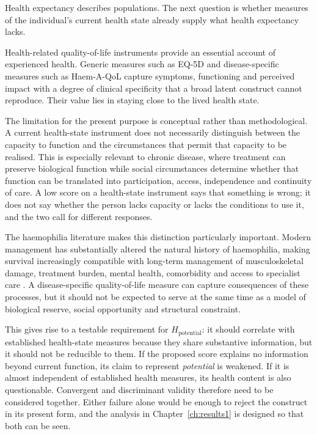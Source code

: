 Health expectancy describes populations. The next question is whether measures of the individual's current health state already supply what health expectancy lacks.

Health-related quality-of-life instruments provide an essential account of experienced health. Generic measures such as EQ-5D \citep{dolan2000,euroqol2020} and disease-specific measures such as Haem-A-QoL capture symptoms, functioning and perceived impact with a degree of clinical specificity that a broad latent construct cannot reproduce. Their value lies in staying close to the lived health state.

The limitation for the present purpose is conceptual rather than methodological. A current health-state instrument does not necessarily distinguish between the capacity to function and the circumstances that permit that capacity to be realised. This is especially relevant to chronic disease, where treatment can preserve biological function while social circumstances determine whether that function can be translated into participation, access, independence and continuity of care. A low score on a health-state instrument says that something is wrong; it does not say whether the person lacks capacity or lacks the conditions to use it, and the two call for different responses.

The haemophilia literature makes this distinction particularly important. Modern management has substantially altered the natural history of haemophilia, making survival increasingly compatible with long-term management of musculoskeletal damage, treatment burden, mental health, comorbidity and access to specialist care \citep{mauser_2009,srivastava_2020}. A disease-specific quality-of-life measure can capture consequences of these processes, but it should not be expected to serve at the same time as a model of biological reserve, social opportunity and structural constraint.

This gives rise to a testable requirement for $H_{\text{potential}}$: it should correlate with established health-state measures because they share substantive information, but it should not be reducible to them. If the proposed score explains no information beyond current function, its claim to represent \emph{potential} is weakened. If it is almost independent of established health measures, its health content is also questionable. Convergent and discriminant validity therefore need to be considered together. Either failure alone would be enough to reject the construct in its present form, and the analysis in Chapter~\ref{ch:results1} is designed so that both can be seen.

